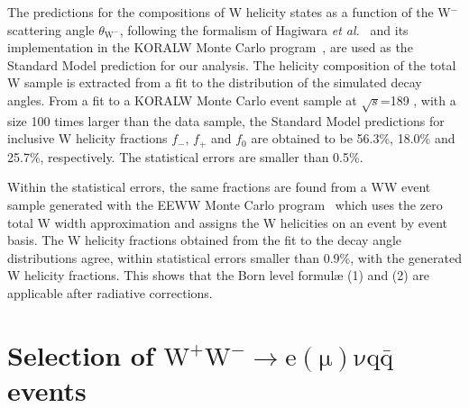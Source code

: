 \documentclass[12pt,a4paper,dvips]{article}
\begin{document}
The predictions for the compositions of W helicity states as 
a function of the W$^{-}$ scattering angle $\theta_{\mathrm{W}^{-}}$, 
following the formalism of Hagiwara {\it et al.}~\cite{Hagiwara87} 
and its implementation in the KORALW Monte Carlo 
program~\cite{KORALW1}, are used as the Standard Model 
prediction for our analysis. 
The helicity composition of the total W sample 
is extracted from a fit to the distribution of
the simulated decay angles.
From a fit to a KORALW Monte Carlo event sample at $\sqrt{s}$=189 \GeV{},
with a size 100 times larger than the data sample, 
the Standard Model predictions for 
inclusive W helicity fractions $f_{-}$, $f_{+}$ and $f_{0}$ 
are obtained to be 56.3\%, 18.0\% and 25.7\%, respectively.
The statistical errors are smaller than 0.5\%.

Within the statistical errors, the same fractions are found from 
a WW event sample generated with the EEWW 
Monte Carlo program~\cite{EEWW} which uses the zero  
total W width approximation and assigns the W helicities 
on an event by event basis.
The W helicity fractions obtained from the fit to the 
decay angle distributions agree, 
within statistical errors smaller than 0.9\%, with the 
generated W helicity fractions. This shows that the Born level 
formul\ae{} (1) and (2) are applicable after radiative corrections. 

\section*{Selection of {\boldmath$ 
{\mathrm {W^{+}W^{-} \rightarrow e (\mu) \nu q\bar{q}}}$} events}
\end{document}
